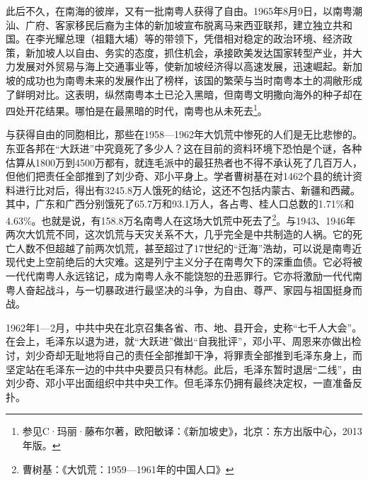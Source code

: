 此后不久，在南海的彼岸，又有一批南粤人获得了自由。1965年8月9日，以南粤潮汕、广府、客家移民后裔为主体的新加坡宣布脱离马来西亚联邦，建立独立共和国。在李光耀总理（祖籍大埔）等的带领下，凭借相对稳定的政治环境、经济政策，新加坡人以自由、务实的态度，抓住机会，承接欧美发达国家转型产业，并大力发展对外贸易与海上交通事业等，使新加坡经济得以高速发展，迅速崛起。新加坡的成功也为南粤未来的发展作出了榜样，该国的繁荣与当时南粤本土的凋敝形成了鲜明对比。这表明，纵然南粤本土已沦入黑暗，但南粤文明撒向海外的种子却在四处开花结果。哪怕是在最黑暗的时代，南粤也从未死去\footnote{参见C·玛丽·藤布尔著，欧阳敏译：《新加坡史》，北京：东方出版中心，2013年版。}。 

与获得自由的同胞相比，那些在1958—1962年大饥荒中惨死的人们是无比悲惨的。东亚各邦在“大跃进”中究竟死了多少人？这在目前的资料环境下恐怕是个谜，各种估算从1800万到4500万都有，就连毛派中的最狂热者也不得不承认死了几百万人，但他们把责任全部推到了刘少奇、邓小平身上。学者曹树基在对1462个县的统计资料进行比对后，得出有3245.8万人饿死的结论，这还不包括内蒙古、新疆和西藏。其中，广东和广西分别饿死了65.7万和93.1万人，各占粤、桂人口总数的1.71\%和4.63\%。也就是说，有158.8万名南粤人在这场大饥荒中死去了\footnote{曹树基：《大饥荒：1959—1961年的中国人口》}。与1943、1946年两次大饥荒不同，这次饥荒与天灾关系不大，几乎完全是中共制造的人祸。它的死亡人数不但超越了前两次饥荒，甚至超过了17世纪的“迁海”浩劫，可以说是南粤近现代史上空前绝后的大灾难。这是列宁主义分子在南粤欠下的深重血债。它必将被一代代南粤人永远铭记，成为南粤人永不能饶恕的丑恶罪行。它亦将激励一代代南粤人奋起战斗，与一切暴政进行最坚决的斗争，为自由、尊严、家园与祖国挺身而战。

1962年1—2月，中共中央在北京召集各省、市、地、县开会，史称“七千人大会”。在会上，毛泽东以退为进，就“大跃进”做出“自我批评”，邓小平、周恩来亦做出检讨，刘少奇却无耻地将自己的责任全部推卸干净，将罪责全部推到毛泽东身上，而坚定站在毛泽东一边的中共中央要员只有林彪。此后，毛泽东暂时退居“二线”，由刘少奇、邓小平出面组织中共中央工作。但毛泽东仍拥有最终决定权，一直准备反扑。

